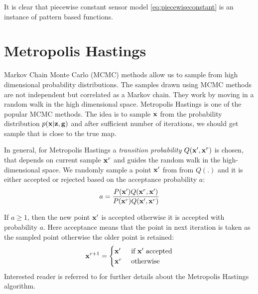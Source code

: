 \documentclass[letterpaper, 10 pt, conference]{ieeeconf} %
\begin{document}
It is clear that piecewise constant sensor model \eqref{eq:piecewiseconstant}
is an instance of pattern based functions.

\section{Metropolis Hastings}
Markov Chain Monte Carlo (MCMC) methods allow us to sample from high dimensional probability distributions. The samples drawn using MCMC methods are not independent but correlated as a Markov chain. They work by moving in a random walk in the high dimensional space. Metropolis Hastings is one of the popular MCMC methods. The idea is to sample $\mathbf{x}$ from the probability distribution $p(\mathbf{x}|\mathbf{z}, \mathbf{g})$ and after sufficient number of iterations, we should get sample that is close to the true map.

In general, for Metropolis Hastings a \emph{transition probability} $Q(\mathbf{x}',
\mathbf{x}^r)$ is chosen, that depends on current sample $\mathbf{x}^r$ and guides
the random walk in the high-dimensional space. We randomly sample a point
$\mathbf{x}'$ from from $Q(.)$ and it is either accepted or rejected based on the
acceptance probability $a$:
\begin{align}
  a = \frac{P(\mathbf{x}')Q(\mathbf{x}^r, \mathbf{x}')}
  {P(\mathbf{x}^r)Q(\mathbf{x}', \mathbf{x}^r)}
\end{align}

If $a \ge 1$, then the new point $\mathbf{x}'$ is accepted otherwise it is accepted with probability $a$. Here acceptance means that the point in next iteration is taken as the sampled point otherwise the older point is retained:
\begin{align}
  \mathbf{x}^{r+1} = \begin{cases}
    \mathbf{x}' & \text{ if $\mathbf{x}'$ accepted}\\
    \mathbf{x}^r & \text{ otherwise}\\
  \end{cases}
\end{align}
Interested reader is referred to \cite{mackay1998introduction} for further details about the Metropolis Hastings algorithm.
\end{document}
